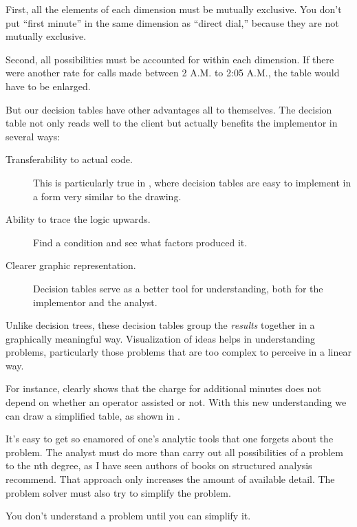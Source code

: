 First, all the elements of each dimension must be mutually exclusive.
You don't put ``first minute'' in the same dimension as ``direct
dial,'' because they are not mutually exclusive.

Second, all possibilities must be accounted for within each dimension.
If there were another rate for calls made between 2 A.M. to 2:05 A.M.,
the table would have to be enlarged.

But our decision tables have other advantages all to themselves.  The
decision table not only reads well to the client but actually benefits
the implementor in several ways:

\begin{description}
\item[Transferability to actual code.] This is particularly true in
\Forth{}, where decision tables are easy to implement in a form very
similar to the drawing.

\item[Ability to trace the logic upwards.] Find a condition and see what
factors produced it.

\item[Clearer graphic representation.] Decision tables serve as a better
tool for understanding, both for the implementor and the analyst.
\end{description}

Unlike decision trees, these decision tables group the \emph{results}
together in a graphically meaningful way. Visualization of ideas helps in
understanding problems, particularly those problems that are too
complex to perceive in a linear way.

For instance,  clearly shows that the charge for
additional minutes does not depend on whether an operator assisted or not.
With this new understanding we can draw a simplified table, as shown
in .



It's easy to get so enamored of one's analytic tools that one forgets
about the problem. The analyst must do more than carry out all
possibilities of a problem to the nth degree, as I have seen authors
of books on structured analysis recommend. That approach only
increases the amount of available detail. The problem solver must also
try to simplify the problem.

\begin{tip}
You don't understand a problem until you can simplify it.
\end{tip}

